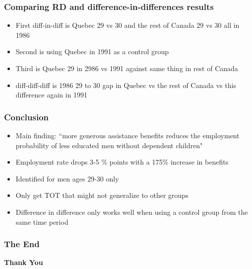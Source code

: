 \documentclass{beamer}
\begin{document}

\begin{frame}
\frametitle{Comparing RD and difference-in-differences results}

\begin{itemize}
	\item First diff-in-diff is Quebec 29 vs 30 and the rest of Canada 29 vs 30 all in 1986 
	\item Second is using Quebec in 1991 as a control group
	\item Third is Quebec 29 in 2986 vs 1991 against same thing in rest of Canada
	\item diff-diff-diff is 1986 29 to 30 gap in Quebec vs the rest of Canada vs this difference again in 1991
\end{itemize}
\end{frame}



\begin{frame}
\frametitle{Conclusion}
\begin{itemize}
	\item Main finding: “more generous assistance benefits reduces the employment probability of less educated men without dependent children"
	\item Employment rate drops 3-5 \% points with a 175\% increase in benefits 
	\item Identified for men ages 29-30 only
	\item  Only get TOT that might not generalize to other groups 
	\item Difference in difference only works well when using a control group from the same time period
\end{itemize}
\end{frame}



\begin{frame}

\frametitle{The End }

\begin{center}
	
	\begin{Huge}
		\textbf{Thank You}
	\end{Huge}
\end{center}
\end{frame}

\end{document}

